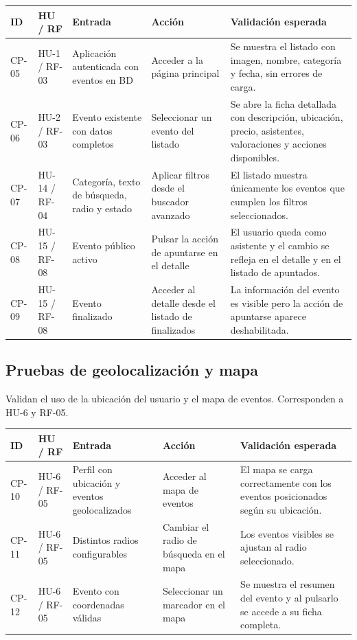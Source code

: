 \begin{longtable}{|p{1.3cm}|p{1.6cm}|p{3cm}|p{3.8cm}|p{4.3cm}|}
\hline
\textbf{ID} & \textbf{HU / RF} & \textbf{Entrada} & \textbf{Acción} & \textbf{Validación esperada} \\
\hline
{}\label{cp:05}CP-05 & HU-1 / RF-03 & Aplicación autenticada con eventos en BD & Acceder a la página principal & Se muestra el listado con imagen, nombre, categoría y fecha, sin errores de carga. \\
\hline
{}\label{cp:06}CP-06 & HU-2 / RF-03 & Evento existente con datos completos & Seleccionar un evento del listado & Se abre la ficha detallada con descripción, ubicación, precio, asistentes, valoraciones y acciones disponibles. \\
\hline
{}\label{cp:07}CP-07 & HU-14 / RF-04 & Categoría, texto de búsqueda, radio y estado & Aplicar filtros desde el buscador avanzado & El listado muestra únicamente los eventos que cumplen los filtros seleccionados. \\
\hline
{}\label{cp:08}CP-08 & HU-15 / RF-08 & Evento público activo & Pulsar la acción de apuntarse en el detalle & El usuario queda como asistente y el cambio se refleja en el detalle y en el listado de apuntados. \\
\hline
{}\label{cp:09}CP-09 & HU-15 / RF-08 & Evento finalizado & Acceder al detalle desde el listado de finalizados & La información del evento es visible pero la acción de apuntarse aparece deshabilitada. \\
\hline
\end{longtable}

\subsection{Pruebas de geolocalización y mapa}

Validan el uso de la ubicación del usuario y el mapa de eventos. Corresponden a HU-6 y RF-05.

\begin{longtable}{|p{1.3cm}|p{1.6cm}|p{3cm}|p{3.8cm}|p{4.3cm}|}
\hline
\textbf{ID} & \textbf{HU / RF} & \textbf{Entrada} & \textbf{Acción} & \textbf{Validación esperada} \\
\hline
{}\label{cp:10}CP-10 & HU-6 / RF-05 & Perfil con ubicación y eventos geolocalizados & Acceder al mapa de eventos & El mapa se carga correctamente con los eventos posicionados según su ubicación. \\
\hline
{}\label{cp:11}CP-11 & HU-6 / RF-05 & Distintos radios configurables & Cambiar el radio de búsqueda en el mapa & Los eventos visibles se ajustan al radio seleccionado. \\
\hline
{}\label{cp:12}CP-12 & HU-6 / RF-05 & Evento con coordenadas válidas & Seleccionar un marcador en el mapa & Se muestra el resumen del evento y al pulsarlo se accede a su ficha completa. \\
\hline
\end{longtable}

